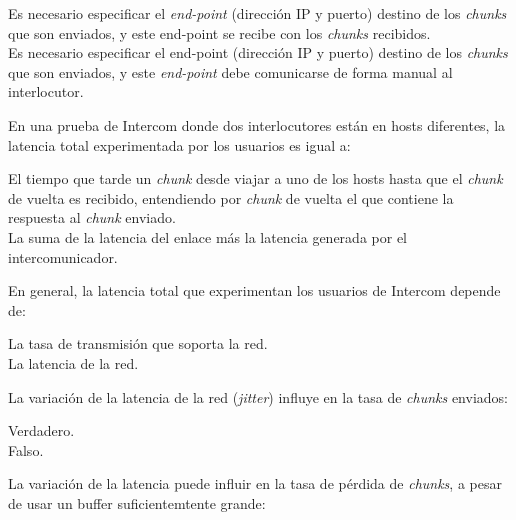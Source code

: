 \documentclass[legalpaper, 12pt, addpoints]{exam}
\begin{document}
\begin{questions}
\begin{oneparchoices}
  \choice Es necesario especificar el \emph{end-point} (dirección IP y puerto) destino de los \emph{chunks} que son enviados, y este end-point se recibe con los \emph{chunks} recibidos.\\
  \choice Es necesario especificar el end-point (dirección IP y puerto) destino de los \emph{chunks} que son enviados, y este \emph{end-point} debe comunicarse de forma manual al interlocutor.
\end{oneparchoices}

\vspace{0.10in}

\question En una prueba de Intercom donde dos interlocutores están en
hosts diferentes, la latencia total experimentada por los usuarios es
igual a:

\begin{oneparchoices}
  \choice El tiempo que tarde un \emph{chunk} desde viajar a uno de los hosts hasta que el \emph{chunk} de vuelta es recibido, entendiendo por \emph{chunk} de vuelta el que contiene la respuesta al \emph{chunk} enviado.\\
  \choice La suma de la latencia del enlace más la latencia generada por el intercomunicador.
\end{oneparchoices}
  
\vspace{0.10in}

\question En general, la latencia total que experimentan los usuarios
de Intercom depende de:

\begin{oneparchoices}
  \choice La tasa de transmisión que soporta la red.\\
  \choice La latencia de la red.
\end{oneparchoices}
  
\vspace{0.10in}

\question La variación de la latencia de la red (\emph{jitter})
influye en la tasa de \emph{chunks} enviados:

\begin{oneparchoices}
  \choice Verdadero.\\
  \choice Falso.
\end{oneparchoices}
  
\vspace{0.10in}

\question La variación de la latencia puede influir en la tasa de
pérdida de \emph{chunks}, a pesar de usar un buffer suficientemtente
grande:


\end{questions}
\end{document}
